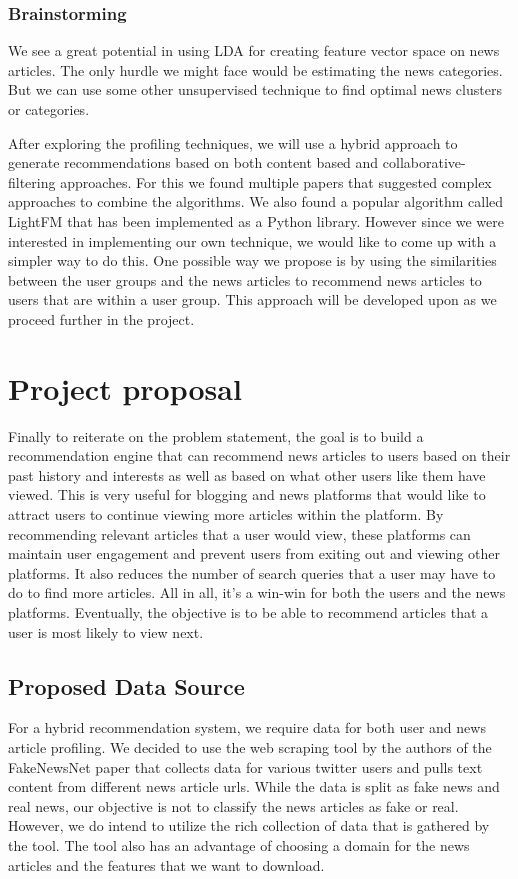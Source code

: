 \documentclass{article}
\begin{document}
\subsubsection{Brainstorming}

We see a great potential in using LDA for creating feature vector space on news articles. The only hurdle we might face would be estimating the news categories. But we can use some other unsupervised technique to find optimal news clusters or categories.

After exploring the profiling techniques, we will use a hybrid approach to generate recommendations based on both content based and collaborative-filtering approaches. For this we found multiple papers that suggested complex approaches to combine the algorithms. We also found a popular algorithm called LightFM \cite{lightfm} that has been implemented as a Python library. However since we were interested in implementing our own technique, we would like to come up with a simpler way to do this. One possible way we propose is by using the similarities between the user groups and the news articles to recommend news articles to users that are within a user group. This approach will be developed upon as we proceed further in the project.

\section{Project proposal}
\label{gen_inst}

Finally to reiterate on the problem statement, the goal is to build a recommendation engine that can recommend news articles to users based on their past history and interests as well as based on what other users like them have viewed. This is very useful for blogging and news platforms that would like to attract users to continue viewing more articles within the platform. By recommending relevant articles that a user would view, these platforms can maintain user engagement and prevent users from exiting out and viewing other platforms. It also reduces the number of search queries that a user may have to do to find more articles. All in all, it’s a win-win for both the users and the news platforms. Eventually, the objective is to be able to recommend articles that a user is most likely to view next.

\subsection{Proposed Data Source}
For a hybrid recommendation system, we require data for both user and news article profiling. We decided to use the web scraping tool by the authors of the FakeNewsNet paper \cite{datasrc} that collects data for various twitter users and pulls text content from different news article urls. While the data is split as fake news and real news, our objective is not to classify the news articles as fake or real. However, we do intend to utilize the rich collection of data that is gathered by the tool. The tool also has an advantage of choosing a domain for the news articles and the features that we want to download. 
\end{document}
